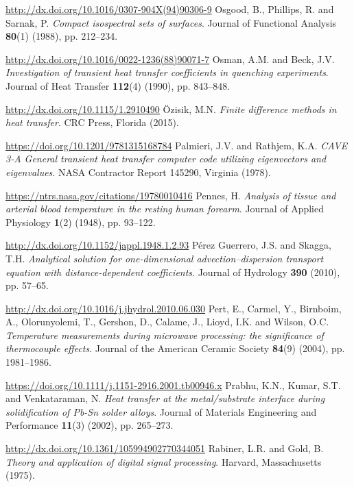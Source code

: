 \begin{thebibliography}{301}
\url{http://dx.doi.org/10.1016/0307-904X(94)90306-9}
%
%
 Osgood, B., Phillips, R. and Sarnak, P. {\it Compact isospectral sets of surfaces}. Journal of Functional Analysis {\bf 80}(1) (1988), pp. 212--234.

\url{http://dx.doi.org/10.1016/0022-1236(88)90071-7}
%
%
 Osman, A.M. and Beck, J.V. {\it Investigation of transient heat transfer coefficients in quenching experiments}. Journal of Heat Transfer {\bf 112}(4) (1990), pp. 843--848.

\url{http://dx.doi.org/10.1115/1.2910490}
%
%
 \"Ozisik, M.N. {\it Finite difference methods in heat transfer}. CRC Press, Florida (2015).

\url{https://doi.org/10.1201/9781315168784}
%
%
 Palmieri, J.V. and Rathjem, K.A. {\it CAVE 3-A General transient heat transfer computer code utilizing eigenvectors and eigenvalues}. NASA Contractor Report 145290, Virginia (1978).

\url{https://ntrs.nasa.gov/citations/19780010416}
%
%
 Pennes, H. {\it Analysis of tissue and arterial blood temperature in the resting human forearm}. Journal of Applied Physiology {\bf 1}(2) (1948), pp. 93--122.

\url{http://dx.doi.org/10.1152/jappl.1948.1.2.93}
%
%
 P\'erez Guerrero, J.S. and Skagga, T.H. {\it Analytical solution for one-dimensional advection–dispersion transport equation with distance-dependent coefficients}. Journal of Hydrology {\bf 390} (2010), pp. 57--65.

\url{http://dx.doi.org/10.1016/j.jhydrol.2010.06.030}
%
%
 Pert, E., Carmel, Y., Birnboim, A., Olorunyolemi, T., Gershon, D., Calame, J., Lioyd, I.K. and Wilson, O.C. {\it Temperature measurements during microwave processing: the significance of thermocouple effects}. Journal of the American Ceramic Society {\bf 84}(9) (2004), pp. 1981--1986.

\url{https://doi.org/10.1111/j.1151-2916.2001.tb00946.x}
%
%
 Prabhu, K.N., Kumar, S.T. and Venkataraman, N. {\it Heat transfer at the metal/substrate interface during solidification of Pb-Sn solder alloys}. Journal of Materials Engineering and Performance {\bf 11}(3) (2002), pp. 265--273.

\url{http://dx.doi.org/10.1361/105994902770344051}
%
%
 Rabiner, L.R. and Gold, B. {\it Theory and application of digital signal processing}. Harvard, Massachusetts (1975).


\end{thebibliography}
